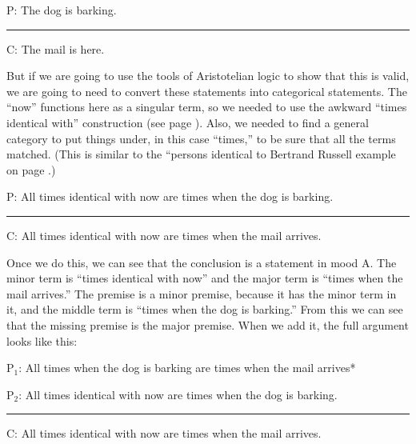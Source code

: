 {\begin{earg}
\item[P:] The dog is barking.
\vspace{-.5em}
\item [] \rule{0.2\linewidth}{.5pt} 
\item[C:] The mail is here.
\end{earg} 

But if we are going to use the tools of Aristotelian logic to show that this is valid, we are going to need to convert these statements into categorical statements. The ``now'' functions here as a singular term, so we needed to use the awkward ``times identical with'' construction (see page \pageref{subsec:singular_propositions}). Also, we needed to find a general category to put things under, in this case ``times,'' to be sure that all the terms matched. (This is similar to the ``persons identical to Bertrand Russell example on page \pageref{finding_general_terms}.) 

\begin{earg}
\item[P:] All times identical with now are times when the dog is barking.
\vspace{-.5em}
\item [] \rule{0.7\linewidth}{.5pt} 
\item[C:] All times identical with now are times when the mail arrives.
\end{earg} 

Once we do this, we can see that the conclusion is a statement in mood A. The minor term is ``times identical with now'' and the major term is ``times when the mail arrives.'' The premise is a minor premise, because it has the minor term in it, and the middle term is ``times when the dog is barking.'' From this we can see that the missing premise is the major premise. When we add it, the full argument looks like this:

\begin{earg}
\item[P$_1$:] All times when the dog is barking are times when the mail arrives*
\item[P$_2$:] All times identical with now are times when the dog is barking.
\vspace{-.5em}
\item [] \rule{0.7\linewidth}{.5pt} 
\item[C:] All times identical with now are times when the mail arrives.
\end{earg} 

}
